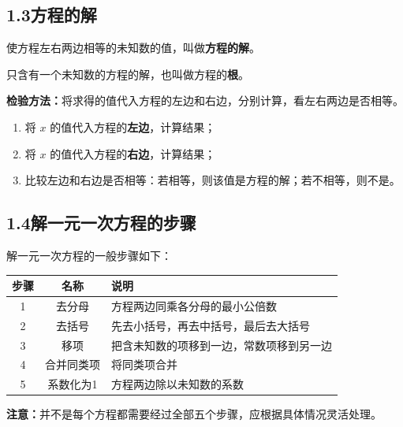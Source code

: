 \documentclass[12pt, a4paper]{ctexart}
\begin{document}
\subsection*{1.3\quad 方程的解}

\begin{knowledgebox}[方程的解]
使方程左右两边相等的未知数的值，叫做\textbf{方程的解}。

只含有一个未知数的方程的解，也叫做方程的\textbf{根}。

\textbf{检验方法：}将求得的值代入方程的左边和右边，分别计算，看左右两边是否相等。
\end{knowledgebox}

\begin{tipbox}[解的检验步骤]
\begin{enumerate}[nosep]
  \item 将 $x$ 的值代入方程的\textbf{左边}，计算结果；
  \item 将 $x$ 的值代入方程的\textbf{右边}，计算结果；
  \item 比较左边和右边是否相等：若相等，则该值是方程的解；若不相等，则不是。
\end{enumerate}
\end{tipbox}

\subsection*{1.4\quad 解一元一次方程的步骤}

\begin{knowledgebox}[解一元一次方程的一般步骤]
解一元一次方程的一般步骤如下：

\begin{center}
\renewcommand{\arraystretch}{1.4}
\begin{tabular}{|c|c|l|}
\hline
\textbf{步骤} & \textbf{名称} & \textbf{说明} \\
\hline
1 & 去分母 & 方程两边同乘各分母的最小公倍数 \\
\hline
2 & 去括号 & 先去小括号，再去中括号，最后去大括号 \\
\hline
3 & 移项 & 把含未知数的项移到一边，常数项移到另一边 \\
\hline
4 & 合并同类项 & 将同类项合并 \\
\hline
5 & 系数化为1 & 方程两边除以未知数的系数 \\
\hline
\end{tabular}
\end{center}

\textbf{注意：}并不是每个方程都需要经过全部五个步骤，应根据具体情况灵活处理。
\end{knowledgebox}
\end{document}
